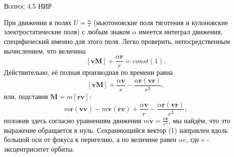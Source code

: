 \documentclass[a4paper, 12pt]{article}
\begin{document}
    \begin{center}
    \textsc{\Large Вопрос 4.5 НИР}\\[0.5cm] 
    \end{center}

    

При движении в полях $ U = \frac{\alpha}{r}$ (ньютоновские поля тяготения и кулоновские электростатические поля) с любым знаком $\alpha$  имеется интеграл движения, специфический именно для этого поля. Легко проверить, непосредственным вычислением, что величина
$$[\textbf{vM}] + \frac {\alpha \textbf{r}}{r} = const (1).$$
Действительно, её полная производная по времени равна
$$[\mathbf{\dot{v}M}] + \frac {\alpha \textbf{v}}{r} - \frac {\alpha \textbf{r} (\textbf{vr})}{r^3},$$
или, подставив $\textbf{M} = m[\textbf{rv}]:$
$$m\mathbf{r(v\dot{v})} - m\mathbf{v(r\dot{v})} + \frac {\alpha \textbf{v}}{r} - \frac {\alpha \textbf{r} (\textbf{vr})}{r^3};$$
положив здесь согласно уравнениям движения $ m\mathbf{\dot{v}} = \frac {\alpha \textbf{r}}{r^3}$, мы найдём, что это выражение обращается в нуль.
Сохраняющийся вектор (1) направлен вдоль большой оси от фокуса к перигелию, а по величине равен $\alpha e$, где $e$ - эксцентриситет орбиты.

    
\end{document}
